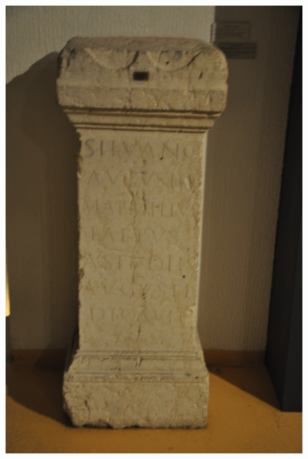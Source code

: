 \begin{figure}[htb]
\centering
    \begin{minipage}[c]{.2\linewidth}
      \includegraphics[width=\linewidth]{figures/B-016-01.jpg}
   \end{minipage}
   \begin{minipage}[c]{.2\linewidth}

\end{minipage}
\end{figure}

